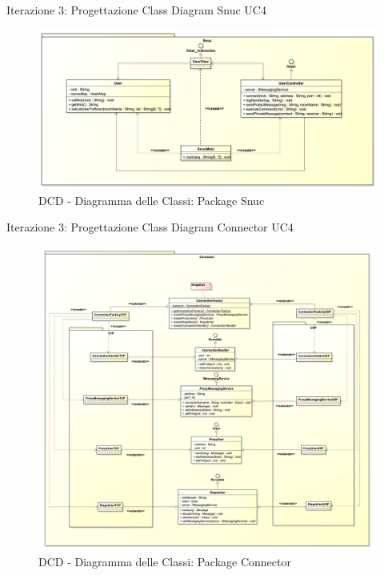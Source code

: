 \begin{frame} {Iterazione 3: Progettazione Class Diagram Snuc UC4}
   \begin{figure}
     \includegraphics[scale=0.16]{image_astah/Iteration_3_DesignModel/ClassDiagramSnuc.png}{\centering}
     \caption{DCD - Diagramma delle Classi: Package Snuc }
     \label{fig_UC4_DCD_3} 
   \end{figure}
\end{frame}

\begin{frame} {Iterazione 3: Progettazione Class Diagram Connector UC4}
   \begin{figure}
     \includegraphics[scale=0.077]{image_astah/Iteration_3_DesignModel/ClassDiagramConnector.png}{\centering}
     \caption{DCD - Diagramma delle Classi: Package Connector }
     \label{fig_UC4_DCD_4} 
   \end{figure}
\end{frame}

